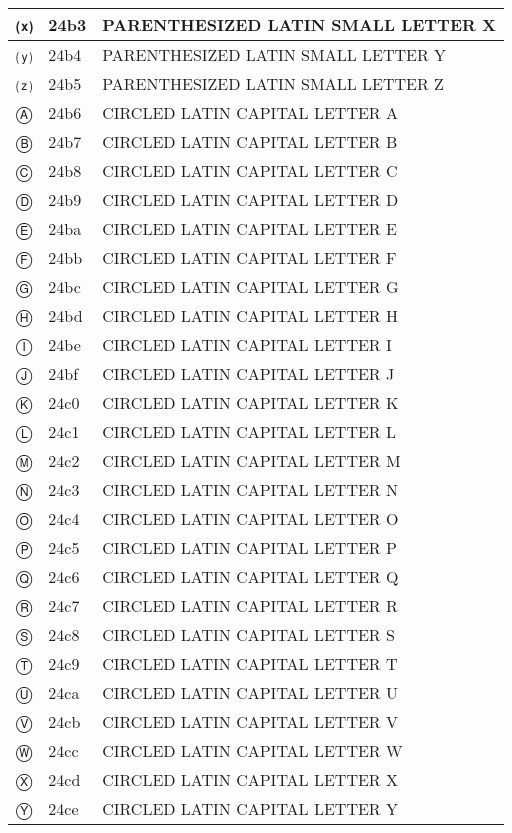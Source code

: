 \documentclass[12pt,letterpaper,openany]{book}
\begin{document}
\begin{center}
\begin{supertabular}{|m{0.25in}|m{0.5in}|m{4in}|}
			⒳ & 24b3 & PARENTHESIZED LATIN SMALL LETTER X\\\hline
			⒴ & 24b4 & PARENTHESIZED LATIN SMALL LETTER Y\\\hline
			⒵ & 24b5 & PARENTHESIZED LATIN SMALL LETTER Z\\\hline
			Ⓐ & 24b6 & CIRCLED LATIN CAPITAL LETTER A\\\hline
			Ⓑ & 24b7 & CIRCLED LATIN CAPITAL LETTER B\\\hline
			Ⓒ & 24b8 & CIRCLED LATIN CAPITAL LETTER C\\\hline
			Ⓓ & 24b9 & CIRCLED LATIN CAPITAL LETTER D\\\hline
			Ⓔ & 24ba & CIRCLED LATIN CAPITAL LETTER E\\\hline
			Ⓕ & 24bb & CIRCLED LATIN CAPITAL LETTER F\\\hline
			Ⓖ & 24bc & CIRCLED LATIN CAPITAL LETTER G\\\hline
			Ⓗ & 24bd & CIRCLED LATIN CAPITAL LETTER H\\\hline
			Ⓘ & 24be & CIRCLED LATIN CAPITAL LETTER I\\\hline
			Ⓙ & 24bf & CIRCLED LATIN CAPITAL LETTER J\\\hline
			Ⓚ & 24c0 & CIRCLED LATIN CAPITAL LETTER K\\\hline
			Ⓛ & 24c1 & CIRCLED LATIN CAPITAL LETTER L\\\hline
			Ⓜ & 24c2 & CIRCLED LATIN CAPITAL LETTER M\\\hline
			Ⓝ & 24c3 & CIRCLED LATIN CAPITAL LETTER N\\\hline
			Ⓞ & 24c4 & CIRCLED LATIN CAPITAL LETTER O\\\hline
			Ⓟ & 24c5 & CIRCLED LATIN CAPITAL LETTER P\\\hline
			Ⓠ & 24c6 & CIRCLED LATIN CAPITAL LETTER Q\\\hline
			Ⓡ & 24c7 & CIRCLED LATIN CAPITAL LETTER R\\\hline
			Ⓢ & 24c8 & CIRCLED LATIN CAPITAL LETTER S\\\hline
			Ⓣ & 24c9 & CIRCLED LATIN CAPITAL LETTER T\\\hline
			Ⓤ & 24ca & CIRCLED LATIN CAPITAL LETTER U\\\hline
			Ⓥ & 24cb & CIRCLED LATIN CAPITAL LETTER V\\\hline
			Ⓦ & 24cc & CIRCLED LATIN CAPITAL LETTER W\\\hline
			Ⓧ & 24cd & CIRCLED LATIN CAPITAL LETTER X\\\hline
			Ⓨ & 24ce & CIRCLED LATIN CAPITAL LETTER Y\\\hline

\end{supertabular}
\end{center}
\end{document}
